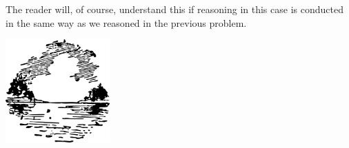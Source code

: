 The reader will, of course, understand this if reasoning in this case is conducted in the same way as we reasoned in the previous problem.




\begin{center}
\includegraphics[width=0.3\textwidth]{figures/ch-02/fig-ch-02-tail.pdf}
\end{center}


















